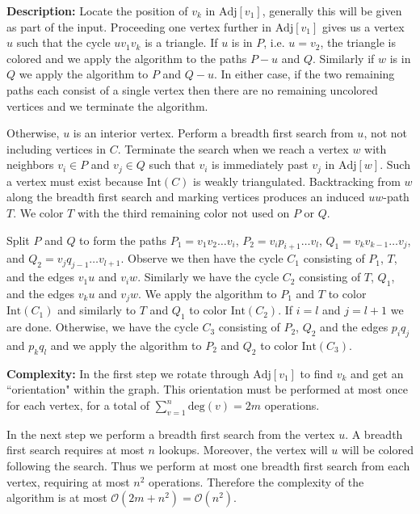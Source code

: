 \documentclass[letterpaper, 12pt]{amsart}
\theoremstyle{definition}
\theoremstyle{definition}
\theoremstyle{thm}
\theoremstyle{definition}
\begin{document}
\noindent\textbf{Description:} Locate the position of $v_k$ in $\text{Adj}[v_1]$,
generally this will be given as part of the input. Proceeding one vertex further
in $\text{Adj}[v_1]$ gives us a vertex $u$ such that the cycle $uv_1v_k$ is a triangle. If
$u$ is in $P$, i.e. $u=v_2$, the triangle is colored and we apply the algorithm
to the paths $P-u$ and $Q$. Similarly if $w$ is in $Q$ we apply the algorithm
to $P$ and $Q-u$. In either case, if the two remaining paths each consist of a
single vertex then there are no remaining uncolored vertices and we terminate
the algorithm.

Otherwise, $u$ is an interior vertex. Perform a breadth first search from $u$,
not not including vertices in $C$. Terminate the search when we reach a vertex
$w$ with neighbors $v_i\in P$ and $v_j \in Q$ such that $v_i$ is immediately
past $v_j$ in $\text{Adj}[w]$. Such a vertex must exist
because $\text{Int}(C)$ is weakly triangulated. Backtracking from $w$ along the
breadth first search and
marking vertices produces an induced $uw$-path $T$. We color $T$ with the third
remaining color not used on $P$ or $Q$.

Split $P$ and $Q$ to form the paths $P_1=v_1v_2\ldots v_i$, $P_2=v_ip_{i+1}\ldots v_l$,
$Q_1=v_kv_{k-1}\ldots v_j$, and $Q_2=v_jq_{j-1}\ldots v_{l+1}$. Observe we then
have the cycle $C_1$ consisting of $P_1$, $T$, and the edges $v_1u$ and $v_iw$.
Similarly we have the cycle $C_2$ consisting of $T$, $Q_1$, and the edges $v_ku$
and $v_jw$. We apply the algorithm to $P_1$ and $T$ to color $\text{Int}(C_1)$
and similarly to $T$ and $Q_1$ to color $\text{Int}(C_2)$. If $i=l$ and
$j=l+1$ we are done. Otherwise, we have the cycle $C_3$ consisting of $P_2$,
$Q_2$ and the edges $p_iq_j$ and $p_kq_l$ and we apply the algorithm to $P_2$
and $Q_2$ to color $\text{Int}(C_3)$.

\noindent\textbf{Complexity:} In the first step we rotate through
$\text{Adj}[v_1]$ to find $v_k$ and get an ``orientation" within the graph. This
orientation must be performed at most once for each vertex, for a total of
$\sum_{v=1}^n\text{deg}(v)=2m$ operations.

In the next step we perform a breadth first search from the vertex $u$.
A breadth first search requires at most $n$ lookups. Moreover, the vertex will
$u$ will be colored following the search. Thus we perform at most one breadth
first search from each vertex, requiring at most $n^2$ operations.
Therefore the complexity of the algorithm is at most
$\mathcal{O}(2m + n^2)=\mathcal{O}(n^2)$.
\end{document}
